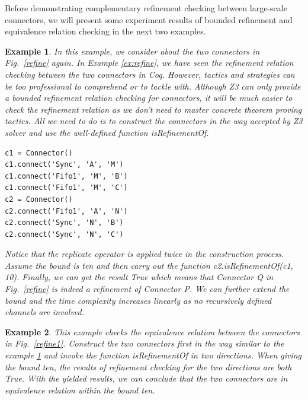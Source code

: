 \documentclass[preprint,3p]{elsarticle}
\newtheorem{example}{Example}[section]
\begin{document}
Before demonstrating complementary refinement checking between large-scale connectors, we will present some experiment results of bounded refinement and equivalence relation checking in the next two examples.
\begin{example}
\label{ex:equivalence1}
In this example, we consider about the two connectors in Fig.~\ref{refine} again. In  Example \ref{ex:refine}, we have seen the refinement relation checking between the two connectors in Coq. However, tactics and strategies can be too professional to comprehend or to tackle with. Although Z3 can only provide a bounded refinement relation checking for connectors, it will be much easier to check the refinement relation as we don't need to master concrete theorem proving tactics. All we need to do is to construct the connectors in the way accepted by Z3 solver and use the well-defined function \emph{isRefinementOf}.
\begin{lstlisting}[frame=single]
c1 = Connector()
c1.connect('Sync', 'A', 'M')
c1.connect('Fifo1', 'M', 'B')
c1.connect('Fifo1', 'M', 'C')
c2 = Connector()
c2.connect('Fifo1', 'A', 'N')
c2.connect('Sync', 'N', 'B')
c2.connect('Sync', 'N', 'C')
\end{lstlisting}
Notice that the \emph{replicate} operator is applied twice in the construction process. Assume the bound is ten and then carry out the function \emph{c2.isRefinementOf(c1, 10)}. Finally, we can get the result \emph{True} which means that \emph{Connector Q} in Fig.~\ref{refine} is indeed a refinement of \emph{Connector P}. We can further extend the bound and the time complexity increases linearly as no recursively defined channels are involved.
\end{example}
\begin{example}
This example checks the equivalence relation between the connectors in Fig.~\ref{refine1}. Construct the two connectors first in the way similar to the example \ref{ex:equivalence1} and invoke the function \emph{isRefinementOf} in two directions.
When giving the bound ten, the results of refinement checking for the two directions are both \emph{True}. With the yielded results, we can conclude that the two connectors are in equivalence relation within the bound ten.
\end{example}
\end{document}

